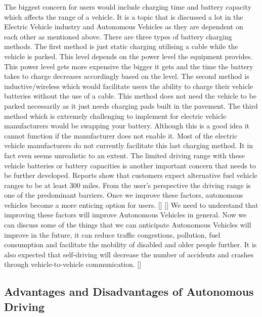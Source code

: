 \documentclass{article}
\begin{document}
The biggest concern for users would include charging time and battery capacity which affects the range of a vehicle. It is a topic that is discussed a lot in the Electric Vehicle industry and Autonomous Vehicles as they are dependent on each other as mentioned above. There are three types of battery charging methods. The first method is just static charging utilising a cable while the vehicle is parked. This level depends on the power level the equipment provides. This power level gets more expensive the bigger it gets and the time the battery takes to charge decreases accordingly based on the level. The second method is inductive/wireless which would facilitate users the ability to charge their vehicle batteries without the use of a cable. This method does not need the vehicle to be parked necessarily as it just needs charging pads built in the pavement. The third method which is extremely challenging to implement for electric vehicle manufacturers would be swapping your battery. Although this is a good idea it cannot function if the manufacturer does not enable it. Most of the electric vehicle manufacturers do not currently facilitate this last charging method. It in fact even seems unrealistic to an extent.
\bigbreak
The limited driving range with these vehicle batteries or battery capacities is another important concern that needs to be further developed. Reports show that customers expect alternative fuel vehicle ranges to be at least 300 miles. From the user’s perspective the driving range is one of the predominant barriers. Once we improve these factors, autonomous vehicles become a more enticing option for users. [\textcite{alsalman2021users}] [\textcite{nieuwenhuis2012new}]
\bigbreak
We need to understand that improving these factors will improve Autonomous Vehicles in general. Now we can discuss some of the things that we can anticipate Autonomous Vehicles will improve in the future, it can reduce traffic congestions, pollution, fuel consumption and facilitate the mobility of disabled and older people further. It is also expected that self-driving will decrease the number of accidents and crashes through vehicle-to-vehicle communication. [\textcite{levinson2011towards}]

\subsection{Advantages and Disadvantages of Autonomous Driving}
\end{document}
